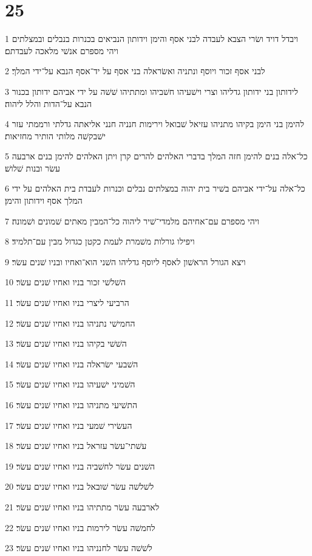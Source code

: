 \chapter{25}

\par 1 ויבדל דויד ושׂרי הצבא לעבדה לבני אסף והימן וידותון הנביאים בכנרות בנבלים ובמצלתים ויהי מספרם אנשׁי מלאכה לעבדתם׃
\par 2 לבני אסף זכור ויוסף ונתניה ואשׂראלה בני אסף על יד־אסף הנבא על־ידי המלך׃
\par 3 לידותון בני ידותון גדליהו וצרי וישׁעיהו חשׁביהו ומתתיהו שׁשׁה על ידי אביהם ידותון בכנור הנבא על־הדות והלל ליהוה׃
\par 4 להימן בני הימן בקיהו מתניהו עזיאל שׁבואל וירימות חנניה חנני אליאתה גדלתי ורממתי עזר ישׁבקשׁה מלותי הותיר מחזיאות׃
\par 5 כל־אלה בנים להימן חזה המלך בדברי האלהים להרים קרן ויתן האלהים להימן בנים ארבעה עשׂר ובנות שׁלושׁ׃
\par 6 כל־אלה על־ידי אביהם בשׁיר בית יהוה במצלתים נבלים וכנרות לעבדת בית האלהים על ידי המלך אסף וידותון והימן׃
\par 7 ויהי מספרם עם־אחיהם מלמדי־שׁיר ליהוה כל־המבין מאתים שׁמונים ושׁמונה׃
\par 8 ויפילו גורלות משׁמרת לעמת כקטן כגדול מבין עם־תלמיד׃
\par 9 ויצא הגורל הראשׁון לאסף ליוסף גדליהו השׁני הוא־ואחיו ובניו שׁנים עשׂר׃
\par 10 השׁלשׁי זכור בניו ואחיו שׁנים עשׂר׃
\par 11 הרביעי ליצרי בניו ואחיו שׁנים עשׂר׃
\par 12 החמישׁי נתניהו בניו ואחיו שׁנים עשׂר׃
\par 13 השׁשׁי בקיהו בניו ואחיו שׁנים עשׂר׃
\par 14 השׁבעי ישׂראלה בניו ואחיו שׁנים עשׂר׃
\par 15 השׁמיני ישׁעיהו בניו ואחיו שׁנים עשׂר׃
\par 16 התשׁיעי מתניהו בניו ואחיו שׁנים עשׂר׃
\par 17 העשׂירי שׁמעי בניו ואחיו שׁנים עשׂר׃
\par 18 עשׁתי־עשׂר עזראל בניו ואחיו שׁנים עשׂר׃
\par 19 השׁנים עשׂר לחשׁביה בניו ואחיו שׁנים עשׂר׃
\par 20 לשׁלשׁה עשׂר שׁובאל בניו ואחיו שׁנים עשׂר׃
\par 21 לארבעה עשׂר מתתיהו בניו ואחיו שׁנים עשׂר׃
\par 22 לחמשׁה עשׂר לירמות בניו ואחיו שׁנים עשׂר׃
\par 23 לשׁשׁה עשׂר לחנניהו בניו ואחיו שׁנים עשׂר׃
